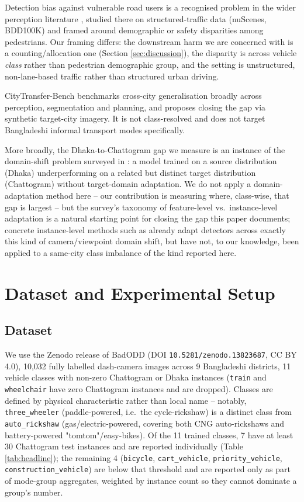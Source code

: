 \documentclass[conference,a4paper]{IEEEtran}
\begin{document}
Detection bias against vulnerable road users is a recognised problem in the wider
perception literature \cite{katare2024bias,wilson2019predictive}, studied there on
structured-traffic data (nuScenes, BDD100K) and framed around demographic or safety
disparities among pedestrians. Our framing differs: the downstream harm we are
concerned with is a counting/allocation one (Section \ref{sec:discussion}), the
disparity is across vehicle \emph{class} rather than pedestrian demographic group, and
the setting is unstructured, non-lane-based traffic rather than structured urban
driving.

CityTransfer-Bench \cite{qian2026citygen} benchmarks cross-city generalisation broadly
across perception, segmentation and planning, and proposes closing the gap via
synthetic target-city imagery. It is not class-resolved and does not target
Bangladeshi informal transport modes specifically.

More broadly, the Dhaka-to-Chattogram gap we measure is an instance of the domain-shift
problem surveyed in \cite{wang2018domainadapt}: a model trained on a source
distribution (Dhaka) underperforming on a related but distinct target distribution
(Chattogram) without target-domain adaptation. We do not apply a domain-adaptation
method here -- our contribution is measuring where, class-wise, that gap is largest --
but the survey's taxonomy of feature-level vs.\ instance-level adaptation is a natural
starting point for closing the gap this paper documents; concrete instance-level
methods such as \cite{chen2018domainadaptivefrcnn} already adapt detectors across
exactly this kind of camera/viewpoint domain shift, but have not, to our knowledge,
been applied to a same-city class imbalance of the kind reported here.

\section{Dataset and Experimental Setup}
\label{sec:dataset}

\subsection{Dataset}
We use the Zenodo release of BadODD (DOI \texttt{10.5281/zenodo.13823687}, CC BY 4.0),
10{,}032 fully labelled dash-camera images across 9 Bangladeshi districts, 11 vehicle
classes with non-zero Chattogram or Dhaka instances (\texttt{train} and
\texttt{wheelchair} have zero Chattogram instances and are dropped). Classes are
defined by physical characteristic rather than local name -- notably,
\texttt{three\_wheeler} (paddle-powered, i.e.\ the cycle-rickshaw) is a distinct class
from \texttt{auto\_rickshaw} (gas/electric-powered, covering both CNG auto-rickshaws
and battery-powered "tomtom"/easy-bikes). Of the 11 trained classes, 7 have at least
30 Chattogram test instances and are reported individually (Table
\ref{tab:headline}); the remaining 4 (\texttt{bicycle}, \texttt{cart\_vehicle},
\texttt{priority\_vehicle}, \texttt{construction\_vehicle}) are below that threshold
and are reported only as part of mode-group aggregates, weighted by instance count so
they cannot dominate a group's number.
\end{document}
